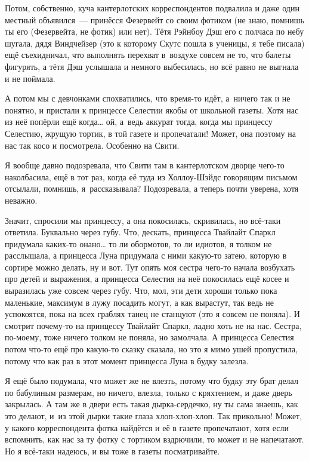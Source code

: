 \documentclass[fontsize=11pt,a5paper,titlepage=firstcover]{scrbook}
\begin{document}
Потом, собственно, куча кантерлотских корреспондентов подвалила и даже один местный объявился~--- принёсся Фезервейт со своим фотиком (не знаю, помнишь ты его (Фезервейта, не фотик) или нет). Тётя Рэйнбоу Дэш его с полчаса по небу шугала, дядя Виндчейзер (это к которому Скутс пошла в ученицы, я тебе писала) ещё съехидничал, что выполнять перехват в~воздухе совсем не то, что балеты фигурять, а тётя Дэш услышала и немного выбесилась, но всё равно не выгнала и не поймала.

А потом мы с девчонками спохватились, что время-то идёт, а~ничего так и не понятно, и пристали к принцессе Селестии якобы от школьной газеты. Хотя нас из неё попёрли ещё когда{\ldots} ой, а~ведь аккурат тогда, когда мы принцессу Селестию, жрущую тортик, в той газете и пропечатали! Может, она поэтому на нас так косо и посмотрела. Особенно на Свити.

Я вообще давно подозревала, что Свити там в кантерлотском дворце чего-то наколбасила, ещё в тот раз, когда её туда из Холлоу-Шэйдс говорящим письмом отсылали, помнишь, я~рассказывала? Подозревала, а теперь почти уверена, хотя неважно.

Значит, спросили мы принцессу, а она покосилась, скривилась, но всё-таки ответила. Буквально через губу. Что, дескать, принцесса Твайлайт Спаркл придумала каких-то онано{\ldots} то ли обормотов, то ли идиотов, я толком не расслышала, а принцесса Луна придумала с ними какую-то затею, которую в сортире можно делать, ну и вот. Тут опять моя сестра чего-то начала возбухать про детей и выражения, а принцесса Селестия на неё покосилась ещё косее и выразилась уже совсем через губу. Что, мол, эти дети хороши только пока маленькие, максимум в лужу посадить могут, а как вырастут, так ведь не успокоятся, пока на всех граблях танец не станцуют (это я совсем не поняла). И смотрит почему-то на принцессу Твайлайт Спаркл, ладно хоть не на нас. Сестра, по-моему, тоже ничего толком не поняла, но замолчала. А принцесса Селестия потом что-то ещё про какую-то сказку сказала, но это я мимо ушей пропустила, потому что как раз в этот момент принцесса Луна в будку залезла.

Я ещё было подумала, что может же не влезть, потому что будку эту брат делал по бабулиным размерам, но ничего, влезла, только с кряхтением, и даже дверь закрылась. А там же в двери есть такая дырка-сердечко, ну ты сама знаешь, как это делают, и~из этой дырки такие глаза хлоп-хлоп-хлоп. Так прикольно! Может, у какого корреспондента фотка найдётся и её в газете пропечатают, хотя если вспомнить, как нас за ту фотку с тортиком вздрючили, то может и не напечатают. Но я всё-таки надеюсь, и вы тоже в газеты посматривайте.
\end{document}
